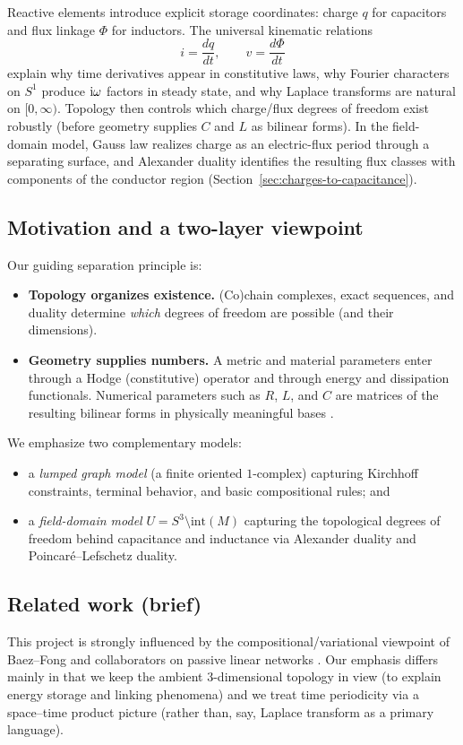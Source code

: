 \documentclass[11pt]{article}
\begin{document}
Reactive elements introduce explicit storage coordinates: charge $q$ for capacitors and flux linkage $\Phi$ for inductors.
The universal kinematic relations
\[
i=\frac{dq}{dt},\qquad v=\frac{d\Phi}{dt}
\]
explain why time derivatives appear in constitutive laws, why Fourier characters on $S^1$ produce $\mathrm{i}\omega$ factors in steady state, and why Laplace transforms are natural on $[0,\infty)$.
Topology then controls which charge/flux degrees of freedom exist robustly (before geometry supplies $C$ and $L$ as bilinear forms).
In the field-domain model, Gauss law realizes charge as an electric-flux period through a separating surface, and Alexander duality identifies the resulting flux classes with components of the conductor region (Section~\ref{sec:charges-to-capacitance}).

\subsection{Motivation and a two-layer viewpoint}
Our guiding separation principle is:
\begin{itemize}
  \item \textbf{Topology organizes existence.} (Co)chain complexes, exact sequences, and duality determine \emph{which} degrees of freedom are possible (and their dimensions).
  \item \textbf{Geometry supplies numbers.} A metric and material parameters enter through a Hodge (constitutive) operator and through energy and dissipation functionals. Numerical parameters such as $R$, $L$, and $C$ are matrices of the resulting bilinear forms in physically meaningful bases \cite{jackson_em_1998,bott_tu_1982}.
\end{itemize}

We emphasize two complementary models:
\begin{itemize}
  \item a \emph{lumped graph model} (a finite oriented $1$-complex) capturing Kirchhoff constraints, terminal behavior, and basic compositional rules; and
  \item a \emph{field-domain model} $U=S^3\setminus \mathrm{int}(M)$ capturing the topological degrees of freedom behind capacitance and inductance via Alexander duality and Poincar\'e--Lefschetz duality.
\end{itemize}

\subsection{Related work (brief)}
This project is strongly influenced by the compositional/variational viewpoint of Baez--Fong and collaborators on passive linear networks \cite{baez_fong_2015_compositional,baez_fong_pollard_2016}.
Our emphasis differs mainly in that we keep the ambient $3$-dimensional topology in view (to explain energy storage and linking phenomena) and we treat time periodicity via a space--time product picture (rather than, say, Laplace transform as a primary language).
\end{document}
